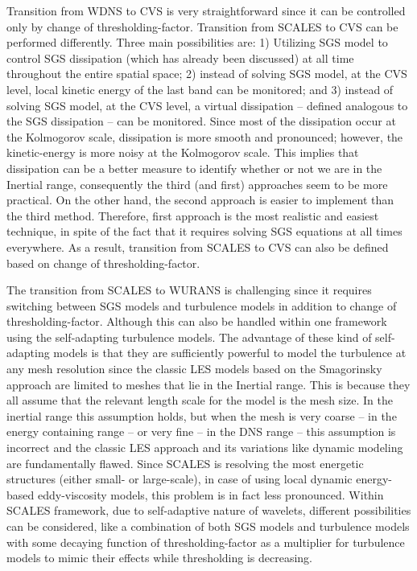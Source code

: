 \begin{itemize}
{Transition from WDNS to CVS is very straightforward since it can be controlled only by change of thresholding-factor. Transition from SCALES to CVS can be performed differently. Three main possibilities are:
1) Utilizing SGS model to control SGS dissipation (which has already been discussed) at all time throughout the entire spatial space;
2) instead of solving SGS model, at the CVS level, local kinetic energy of the last band can be monitored; and
3) instead of solving SGS model, at the CVS level, a virtual dissipation -- defined analogous to the SGS dissipation -- can be monitored.
%
Since most of the dissipation occur at the Kolmogorov scale, dissipation is more smooth and pronounced;
however, the kinetic-energy is more noisy at the Kolmogorov scale. This implies that dissipation can be a better measure to identify whether or not we are in the Inertial range, consequently the third (and first) approaches seem to be more practical. On the other hand, the second approach is easier to implement than the third method.
Therefore, first approach is the most realistic and easiest technique, in spite of the fact that it requires solving SGS equations at all times everywhere. As a result, transition from SCALES to CVS can also be defined based on change of thresholding-factor.

The transition from SCALES to WURANS is challenging since it requires switching between SGS models and turbulence models in addition to change of thresholding-factor. Although this can also be handled within one framework using the self-adapting turbulence models\cite{PetrotGadebusch_SelfAdaptingModel_POF_2007}.
The advantage of these kind of self-adapting models is that they are sufficiently powerful to model the turbulence
at any mesh resolution since the classic LES models based on the Smagorinsky approach are limited
to meshes that lie in the Inertial range. This is because
they all assume that the relevant length scale for the model is
the mesh size. In the inertial range this assumption holds, but
when the mesh is very coarse -- in the energy containing
range -- or very fine -- in the DNS range -- this assumption is
incorrect\cite{MeneveauLund_DynamicSmagorinskyModel__POF_1997}
and the classic LES approach and its variations like dynamic modeling are fundamentally flawed\cite{PetrotGadebusch_SelfAdaptingModel_POF_2007}.
%
Since SCALES is resolving the most energetic structures (either small- or large-scale), in case of using
local dynamic energy-based eddy-viscosity models, this problem is in fact less pronounced. %
%
Within SCALES framework, due to self-adaptive nature of wavelets, different possibilities can be considered, like
a combination of both SGS models and turbulence models with some decaying function of thresholding-factor
as a multiplier for turbulence models to mimic their effects while thresholding is decreasing.

}
\end{itemize}
